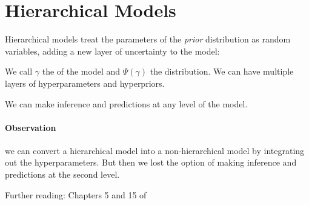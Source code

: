 
\section{Hierarchical Models}

Hierarchical models treat the parameters of the \emph{prior} distribution
as random variables, adding a new layer of uncertainty to the model:


We call $\gamma$ the  of the model and $\Psi(\gamma)$
the  distribution. We can have multiple layers of
hyperparameters and hyperpriors.

We can make inference and predictions at any level of the model.

\paragraph{Observation} we can convert a hierarchical model into a non-hierarchical
model by integrating out the hyperparameters. But then we lost the option
of making inference and predictions at the second level.

Further reading: Chapters 5 and 15 of \cite{gelman_bayesian_2013}
